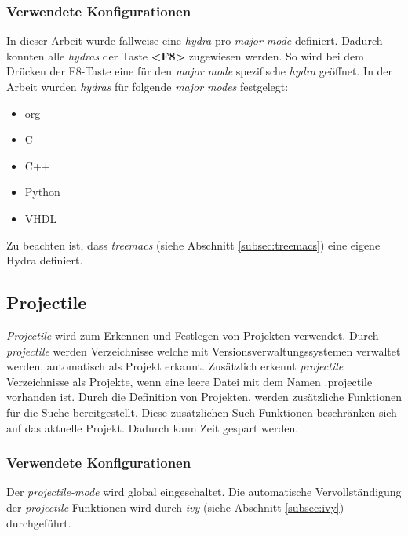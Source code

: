 \subsubsection{Verwendete Konfigurationen}
In dieser Arbeit wurde fallweise eine \textit{hydra} pro \textit{major
  mode} definiert. Dadurch konnten alle \textit{hydras} der Taste
\textbf{<F8>} zugewiesen werden. So wird bei dem Drücken der F8-Taste
eine für den \textit{major mode} spezifische \textit{hydra}
geöffnet. In der Arbeit wurden \textit{hydras} für folgende
\textit{major modes} festgelegt:
\begin{itemize}
\item org
\item C
\item C++
\item Python
\item VHDL
\end{itemize}
Zu beachten ist, dass \textit{treemacs} (siehe Abschnitt
\ref{subsec:treemacs}) eine eigene Hydra definiert.\\

\subsection{Projectile}
\label{subsec:projectile}
\textit{Projectile} wird zum Erkennen und Festlegen von Projekten
verwendet. Durch \textit{projectile} werden Verzeichnisse welche mit
Versionsverwaltungssystemen verwaltet werden, automatisch als Projekt
erkannt. Zusätzlich erkennt \textit{projectile} Verzeichnisse als
Projekte, wenn eine leere Datei mit dem Namen
{\glqq}.projectile{\grqq} vorhanden ist. Durch die Definition von
Projekten, werden zusätzliche Funktionen für die Suche
bereitgestellt. Diese zusätzlichen Such-Funktionen beschränken sich
auf das aktuelle Projekt. Dadurch kann Zeit gespart
werden. \cite{Projectile}\\

\subsubsection{Verwendete Konfigurationen}
Der \textit{projectile-mode} wird global eingeschaltet. Die
automatische Vervollständigung der \textit{projectile}-Funktionen wird
durch \textit{ivy} (siehe Abschnitt \ref{subsec:ivy}) durchgeführt.\\

